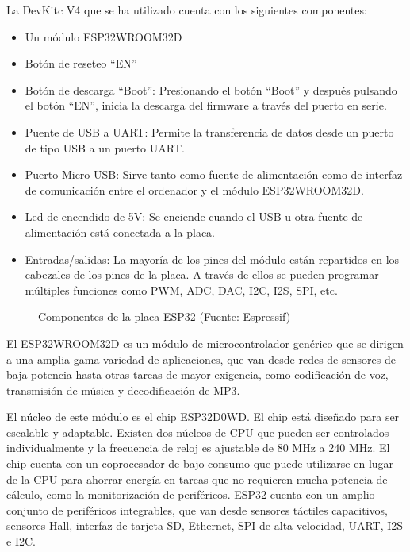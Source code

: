 \documentclass[a4paper,11pt,spanish]{sphinxmanual}
\let\sphinxpxdimen\pdfpxdimen\else\newdimen\sphinxpxdimen
\begin{document}
\sphinxAtStartPar
La DevKitc V4 que se ha utilizado cuenta con los siguientes componentes:
\begin{itemize}
\item {} 
\sphinxAtStartPar
Un módulo ESP32\sphinxhyphen{}WROOM\sphinxhyphen{}32D

\item {} 
\sphinxAtStartPar
Botón de reseteo “EN”

\item {} 
\sphinxAtStartPar
Botón de descarga “Boot”: Presionando el botón “Boot” y después
pulsando el botón “EN”, inicia la descarga del firmware a través
del puerto en serie.

\item {} 
\sphinxAtStartPar
Puente de USB a UART: Permite la transferencia de datos desde un
puerto de tipo USB a un puerto UART.

\item {} 
\sphinxAtStartPar
Puerto Micro USB: Sirve tanto como fuente de alimentación como de
interfaz de comunicación entre el ordenador y el módulo ESP32\sphinxhyphen{}WROOM\sphinxhyphen{}32D.

\item {} 
\sphinxAtStartPar
Led de encendido de 5V: Se enciende cuando el USB u otra fuente de
alimentación está conectada a la placa.

\item {} 
\sphinxAtStartPar
Entradas/salidas: La mayoría de los pines del módulo están repartidos
en los cabezales de los pines de la placa. A través de ellos se pueden
programar múltiples funciones como PWM, ADC, DAC, I2C, I2S, SPI, etc.

\end{itemize}

\begin{figure}[htbp]
\centering
\capstart

\noindent\sphinxincludegraphics[width=500\sphinxpxdimen]{{esp32-devkitc-functional-overview}.jpg}
\caption{Componentes de la placa ESP32 (Fuente: Espressif)}\label{\detokenize{hardware:id6}}\end{figure}

\sphinxAtStartPar
El ESP32\sphinxhyphen{}WROOM\sphinxhyphen{}32D es un módulo de microcontrolador genérico que se dirigen
a una amplia gama variedad de aplicaciones, que van desde redes de sensores
de baja potencia hasta otras tareas de mayor exigencia, como codificación
de voz, transmisión de música y decodificación de MP3.

\sphinxAtStartPar
El núcleo de este módulo es el chip ESP32\sphinxhyphen{}D0WD. El chip está diseñado para
ser escalable y adaptable. Existen dos núcleos de CPU que pueden ser
controlados individualmente y la frecuencia de reloj es ajustable de 80 MHz
a 240 MHz. El chip cuenta con un coprocesador de bajo consumo que
puede utilizarse en lugar de la CPU para ahorrar energía en tareas
que no requieren mucha potencia de cálculo, como la monitorización de
periféricos. ESP32 cuenta con un amplio conjunto de periféricos integrables,
que van desde sensores táctiles capacitivos, sensores Hall, interfaz
de tarjeta SD, Ethernet, SPI de alta velocidad, UART, I2S e I2C.
\end{document}
